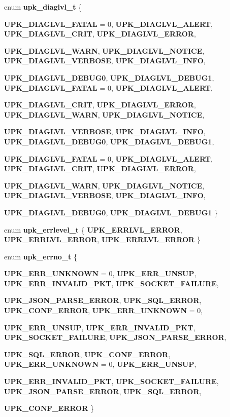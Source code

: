 \begin{DoxyCompactItemize}
\item 
enum {\bf upk\_\-diaglvl\_\-t} \{ \par
{\bf UPK\_\-DIAGLVL\_\-FATAL} =  0, 
{\bf UPK\_\-DIAGLVL\_\-ALERT}, 
{\bf UPK\_\-DIAGLVL\_\-CRIT}, 
{\bf UPK\_\-DIAGLVL\_\-ERROR}, 
\par
{\bf UPK\_\-DIAGLVL\_\-WARN}, 
{\bf UPK\_\-DIAGLVL\_\-NOTICE}, 
{\bf UPK\_\-DIAGLVL\_\-VERBOSE}, 
{\bf UPK\_\-DIAGLVL\_\-INFO}, 
\par
{\bf UPK\_\-DIAGLVL\_\-DEBUG0}, 
{\bf UPK\_\-DIAGLVL\_\-DEBUG1}, 
{\bf UPK\_\-DIAGLVL\_\-FATAL} =  0, 
{\bf UPK\_\-DIAGLVL\_\-ALERT}, 
\par
{\bf UPK\_\-DIAGLVL\_\-CRIT}, 
{\bf UPK\_\-DIAGLVL\_\-ERROR}, 
{\bf UPK\_\-DIAGLVL\_\-WARN}, 
{\bf UPK\_\-DIAGLVL\_\-NOTICE}, 
\par
{\bf UPK\_\-DIAGLVL\_\-VERBOSE}, 
{\bf UPK\_\-DIAGLVL\_\-INFO}, 
{\bf UPK\_\-DIAGLVL\_\-DEBUG0}, 
{\bf UPK\_\-DIAGLVL\_\-DEBUG1}, 
\par
{\bf UPK\_\-DIAGLVL\_\-FATAL} =  0, 
{\bf UPK\_\-DIAGLVL\_\-ALERT}, 
{\bf UPK\_\-DIAGLVL\_\-CRIT}, 
{\bf UPK\_\-DIAGLVL\_\-ERROR}, 
\par
{\bf UPK\_\-DIAGLVL\_\-WARN}, 
{\bf UPK\_\-DIAGLVL\_\-NOTICE}, 
{\bf UPK\_\-DIAGLVL\_\-VERBOSE}, 
{\bf UPK\_\-DIAGLVL\_\-INFO}, 
\par
{\bf UPK\_\-DIAGLVL\_\-DEBUG0}, 
{\bf UPK\_\-DIAGLVL\_\-DEBUG1}
 \}
\item 
enum {\bf upk\_\-errlevel\_\-t} \{ {\bf UPK\_\-ERRLVL\_\-ERROR}, 
{\bf UPK\_\-ERRLVL\_\-ERROR}, 
{\bf UPK\_\-ERRLVL\_\-ERROR}
 \}
\item 
enum {\bf upk\_\-errno\_\-t} \{ \par
{\bf UPK\_\-ERR\_\-UNKNOWN} =  0, 
{\bf UPK\_\-ERR\_\-UNSUP}, 
{\bf UPK\_\-ERR\_\-INVALID\_\-PKT}, 
{\bf UPK\_\-SOCKET\_\-FAILURE}, 
\par
{\bf UPK\_\-JSON\_\-PARSE\_\-ERROR}, 
{\bf UPK\_\-SQL\_\-ERROR}, 
{\bf UPK\_\-CONF\_\-ERROR}, 
{\bf UPK\_\-ERR\_\-UNKNOWN} =  0, 
\par
{\bf UPK\_\-ERR\_\-UNSUP}, 
{\bf UPK\_\-ERR\_\-INVALID\_\-PKT}, 
{\bf UPK\_\-SOCKET\_\-FAILURE}, 
{\bf UPK\_\-JSON\_\-PARSE\_\-ERROR}, 
\par
{\bf UPK\_\-SQL\_\-ERROR}, 
{\bf UPK\_\-CONF\_\-ERROR}, 
{\bf UPK\_\-ERR\_\-UNKNOWN} =  0, 
{\bf UPK\_\-ERR\_\-UNSUP}, 
\par
{\bf UPK\_\-ERR\_\-INVALID\_\-PKT}, 
{\bf UPK\_\-SOCKET\_\-FAILURE}, 
{\bf UPK\_\-JSON\_\-PARSE\_\-ERROR}, 
{\bf UPK\_\-SQL\_\-ERROR}, 
\par
{\bf UPK\_\-CONF\_\-ERROR}
 \}
\end{DoxyCompactItemize}
